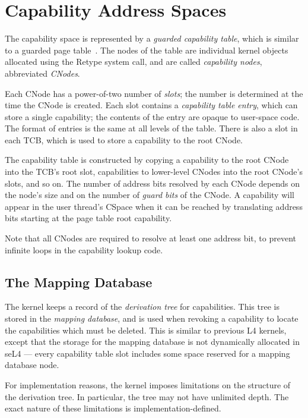 \section{Capability Address Spaces}\label{sec:overview.cspace}

The capability space is represented by a \emph{guarded capability table},
which is similar to a guarded page table~\cite{Liedtke-94a}. The nodes of the
table are individual kernel objects allocated using the Retype system call,
and are called \emph{capability nodes}, abbreviated \emph{CNodes}.

Each CNode has a power-of-two number of \emph{slots}; the number is determined
at the time the CNode is created. Each slot contains a \emph{capability table
entry}, which can store a single capability; the contents of the entry are
opaque to user-space code. The format of entries is the same at all levels of
the table. There is also a slot in each TCB, which is used to store a
capability to the root CNode.

The capability table is constructed by copying a capability to the root CNode
into the TCB's root slot, capabilities to lower-level CNodes into the root
CNode's slots, and so on. The number of address bits resolved by each CNode
depends on the node's size and on the number of \emph{guard bits} of the CNode. 
A capability will appear in the user thread's CSpace when it can be reached by
translating address bits starting at the page table root capability.

Note that all CNodes are required to resolve at least one address bit, to
prevent infinite loops in the capability lookup code.

\subsection{The Mapping Database}\label{sec:overview.cspace.mdb}

The kernel keeps a record of the \emph{derivation tree} for capabilities. This
tree is stored in the \emph{mapping database}, and is used when revoking a
capability to locate the capabilities which must be deleted. This is similar to
previous L4 kernels, except that the storage for the mapping database is not
dynamically allocated in seL4 --- every capability table slot includes some
space reserved for a mapping database node.

For implementation reasons, the kernel imposes limitations on the structure of
the derivation tree. In particular, the tree may not have unlimited depth. The
exact nature of these limitations is implementation-defined.

